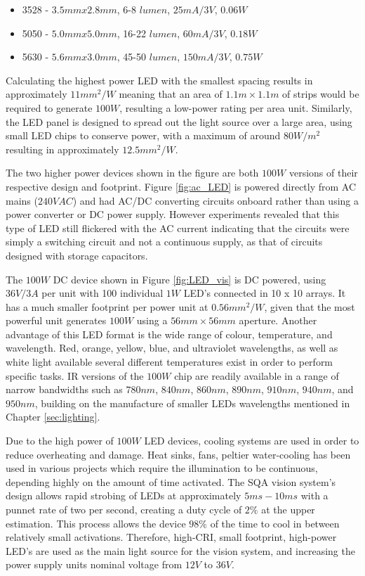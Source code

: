 \documentclass[fleqn,twoside,12pt]{report}
\begin{document}
\begin{itemize}
	\item 3528 - $3.5mm x 2.8mm$, 6-8 $lumen$, $25mA/3V$, $0.06W$
	\item 5050 - $5.0mm x 5.0mm$, 16-22 $lumen$, $60mA/3V$, $0.18W$
	\item 5630 - $5.6mm x 3.0mm$, 45-50 $lumen$, $150mA/3V$, $0.75W$
\end{itemize}
 
Calculating the highest power LED with the smallest spacing results in approximately $11mm^2/W$ meaning that an area of $1.1m\times 1.1m$ of strips would be required to generate $100W$, resulting a low-power rating per area unit. Similarly, the LED panel is designed to spread out the light source over a large area, using small LED chips to conserve power, with a maximum of around $80W/m^2$ resulting in approximately $12.5mm^2/W$. 

The two higher power devices shown in the figure are both $100W$ versions of their respective design and footprint. Figure \ref{fig:ac_LED} is powered directly from AC mains ($240VAC$) and had AC/DC converting circuits onboard rather than using a power converter or DC power supply. However experiments revealed that this type of LED still flickered with the AC current indicating that the circuits were simply a switching circuit and not a continuous supply, as that of circuits designed with storage capacitors. 

The $100W$ DC device shown in Figure \ref{fig:LED_vis} is DC powered, using $36V/3A$ per unit with 100 individual $1W$ LED's connected in 10 x 10 arrays. It has a much smaller footprint per power unit at $0.56mm^2/W$, given that the most powerful unit generates $100W$ using a $56mm\times 56mm$ aperture. Another advantage of this LED format is the wide range of colour, temperature, and wavelength. Red, orange, yellow, blue, and ultraviolet wavelengths, as well as white light available several different temperatures exist in order to perform specific tasks. IR versions of the $100W$ chip are readily available in a range of narrow bandwidths such as $780nm$, $840nm$, $860nm$, $890nm$, $910nm$, $940nm$, and $950nm$, building on the manufacture of smaller LEDs wavelengths mentioned in Chapter \ref{sec:lighting}. 

Due to the high power of $100W$ LED devices, cooling systems are used in order to reduce overheating and damage. Heat sinks, fans, peltier water-cooling has been used in various projects which require the illumination to be continuous, depending highly on the amount of time activated. The SQA vision system's design allows rapid strobing of LEDs at approximately $5ms-10ms$ with a punnet rate of two per second, creating a duty cycle of $2\%$ at the upper estimation. This process allows the device $98\%$ of the time to cool in between relatively small activations. Therefore, high-CRI, small footprint, high-power LED's are used as the main light source for the vision system, and increasing the power supply units nominal voltage from $12V$ to $36V$.
\end{document}
